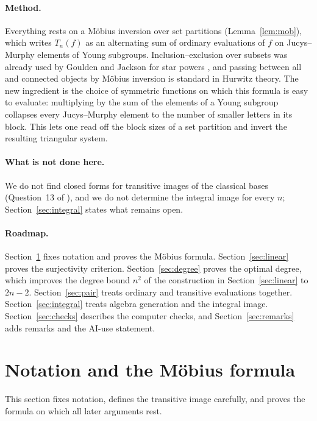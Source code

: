 \documentclass[11pt,a4paper]{article}
\theoremstyle{definition}
\begin{document}
\paragraph{Method.} Everything rests on a M\"obius inversion over set partitions (Lemma~\ref{lem:mob}), which writes $T_n(f)$ as an alternating sum of ordinary evaluations of $f$ on Jucys--Murphy elements of Young subgroups. Inclusion--exclusion over subsets was already used by Goulden and Jackson for star powers \cite[Section~1.1]{gj}, and passing between all and connected objects by M\"obius inversion is standard in Hurwitz theory. The new ingredient is the choice of symmetric functions on which this formula is easy to evaluate: multiplying by the sum of the elements of a Young subgroup collapses every Jucys--Murphy element to the number of smaller letters in its block. This lets one read off the block sizes of a set partition and invert the resulting triangular system.

\paragraph{What is not done here.} We do not find closed forms for transitive images of the classical bases (Question~13 of \cite{clr}), and we do not determine the integral image for every $n$; Section~\ref{sec:integral} states what remains open.

\paragraph{Roadmap.} Section~\ref{sec:setup} fixes notation and proves the M\"obius formula. Section~\ref{sec:linear} proves the surjectivity criterion. Section~\ref{sec:degree} proves the optimal degree, which improves the degree bound $n^2$ of the construction in Section~\ref{sec:linear} to $2n-2$. Section~\ref{sec:pair} treats ordinary and transitive evaluations together. Section~\ref{sec:integral} treats algebra generation and the integral image. Section~\ref{sec:checks} describes the computer checks, and Section~\ref{sec:remarks} adds remarks and the AI-use statement.

\section{Notation and the M\"obius formula}\label{sec:setup}
This section fixes notation, defines the transitive image carefully, and proves the formula on which all later arguments rest.
\end{document}
